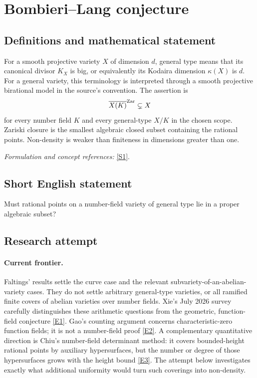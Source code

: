 \documentclass[11pt,a4paper]{article}
\newcommand{\sref}[2]{\hyperlink{source:#1:#2}{[S#2]}}
\newcommand{\eref}[2]{\hyperlink{extra:#1:#2}{[E#2]}}
\newif\ifshowcatalogue
\newcommand{\cataloguescope}[1]{\ifshowcatalogue
 \paragraph{Exact scope in the supplied catalogue.}
 \begin{quote}\small #1\end{quote}\fi}
\numberwithin{equation}{section}
\begin{document}
\setcounter{section}{0}
\clearpage
\section*{\texorpdfstring{Bombieri–Lang conjecture}{Bombieri–Lang conjecture}}\label{statement}
\subsection{Definitions and mathematical statement}
For a smooth projective variety $X$ of dimension $d$, general type means that its canonical divisor $K_X$ is big, or equivalently its Kodaira dimension $\kappa(X)$ is $d$. For a general variety, this terminology is interpreted through a smooth projective birational model in the source's convention. The assertion is
\[
 \overline{X(K)}^{\rm Zar}\subsetneq X
\]
for every number field $K$ and every general-type $X/K$ in the chosen scope. Zariski closure is the smallest algebraic closed subset containing the rational points. Non-density is weaker than finiteness in dimensions greater than one.
\par\smallskip\textit{Formulation and concept references:} \sref{statement}{1}.
\cataloguescope{Prove that for every variety X of general type defined over a number field K, the set of K-rational points X(K) is not Zariski dense in X.}
\subsection{Short English statement}
Must rational points on a number-field variety of general type lie in a proper algebraic subset?
\subsection{Research attempt}

\paragraph{Current frontier.}
Faltings' results settle the curve case and the relevant subvariety-of-an-abelian-variety cases. They do not settle arbitrary general-type varieties, or all ramified finite covers of abelian varieties over number fields. Xie's July 2026 survey carefully distinguishes these arithmetic questions from the geometric, function-field conjecture \eref{statement}{1}. Gao's counting argument concerns characteristic-zero function fields; it is not a number-field proof \eref{statement}{2}. A complementary quantitative direction is Chiu's number-field determinant method: it covers bounded-height rational points by auxiliary hypersurfaces, but the number or degree of those hypersurfaces grows with the height bound \eref{statement}{3}. The attempt below investigates exactly what additional uniformity would turn such coverings into non-density.
\end{document}
